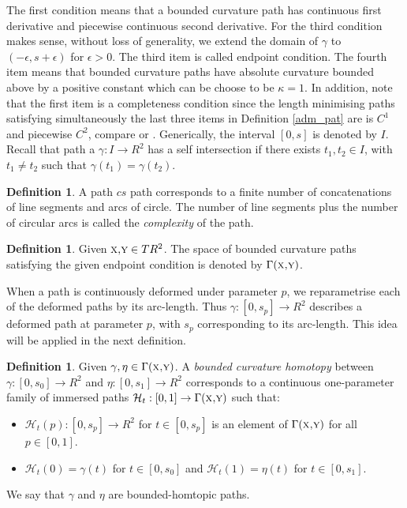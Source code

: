 \documentclass{amsart}
\theoremstyle{definition}
\newtheorem{definition}[theorem]{Definition}
\theoremstyle{remark}
\numberwithin{equation}{section}
\begin{document}
The first condition means that a bounded curvature path has continuous first derivative and piecewise continuous second derivative. For the third condition makes sense, without loss of generality, we extend the domain of $\gamma$ to $(-\epsilon,s+\epsilon)$ for $\epsilon>0$. The third item is called endpoint condition. The fourth item means that  bounded curvature paths have absolute curvature bounded above by a positive constant which can be choose to be $\kappa=1$. In addition, note that the first item is a completeness condition since the length minimising paths satisfying simultaneously the last three items in Definition \ref{adm_pat} are is $C^1$ and piecewise $C^2$, compare \cite{papera} or \cite{dubins 1}. Generically, the interval $[0,s]$ is denoted by $I$. Recall that path a $\gamma: I \rightarrow {R}^2$ has a self intersection if there exists $t_1,t_2 \in I$, with $t_1\neq t_2$ such that $\gamma(t_1)=\gamma(t_2)$.

\begin{definition} A path $cs$ path corresponds to a finite number of concatenations of line segments and arcs of circle. The number of line segments plus the number of circular arcs is called the {\it complexity} of the path.
\end{definition}

 \begin{definition} \label{admsp} Given $\mbox{\sc x,y}\in T{ R}^2$. The space of bounded curvature paths satisfying the given endpoint condition is denoted by $\Gamma(\mbox{\sc x,y})$. \end{definition}

  When a path is continuously deformed under parameter $p$, we reparametrise each of the deformed paths by its arc-length. Thus $\gamma: [0,s_p]\rightarrow { R}^2$ describes a deformed path at parameter $p$, with $s_p$ corresponding to its arc-length. This idea will be applied in the next definition.

\begin{definition}  \label{hom_adm} Given $\gamma,\eta \in \Gamma(\mbox{\sc x,y})$. A {\it bounded curvature homotopy}  between $\gamma: [0,s_0] \rightarrow  R^2$ and $\eta: [0,s_1] \rightarrow  R^2$ corresponds to a continuous one-parameter family of immersed paths $ {\mathcal H}_t: [0,1] \rightarrow \Gamma(\mbox{\sc x,y})$ such that:
\begin{itemize}
\item ${\mathcal H}_t(p): [0,s_p] \rightarrow  R^2$ for $t\in [0,s_p]$ is an element of $\Gamma(\mbox{\sc x,y})$ for all $p\in [0,1]$.
\item $ {\mathcal H}_t(0)=\gamma(t)$ for $t\in [0,s_0]$ and ${\mathcal H}_t(1)=\eta(t)$ for $t\in [0,s_1]$.
\end{itemize}
We say that $\gamma$ and $\eta$ are bounded-homtopic paths.
\end{definition}
\end{document}
